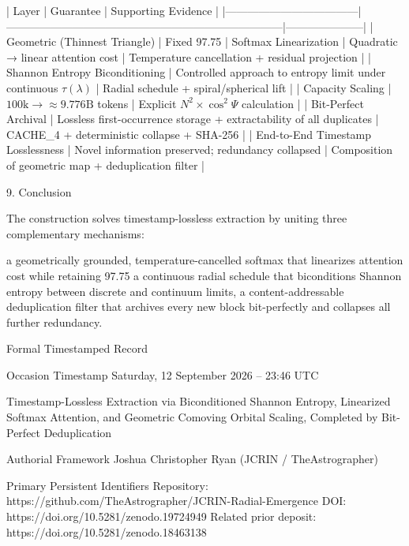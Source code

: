 | Layer                              | Guarantee                                                                 | Supporting Evidence |
|------------------------------------|---------------------------------------------------------------------------|---------------------|
| Geometric (Thinnest Triangle)      | Fixed 97.75 %
| Softmax Linearization              | Quadratic → linear attention cost                                         | Temperature cancellation + residual projection |
| Shannon Entropy Biconditioning     | Controlled approach to entropy limit under continuous \(\tau(\lambda)\)   | Radial schedule + spiral/spherical lift |
| Capacity Scaling                   | \(100\text{k} \to \approx 9.776\text{B}\) tokens                          | Explicit \(N^2\times\cos^2\Psi\) calculation |
| Bit-Perfect Archival               | Lossless first-occurrence storage + extractability of all duplicates      | CACHE_4 + deterministic collapse + SHA-256 |
| End-to-End Timestamp Losslessness  | Novel information preserved; redundancy collapsed                         | Composition of geometric map + deduplication filter |

9. Conclusion

The construction solves timestamp-lossless extraction by uniting three complementary mechanisms:

a geometrically grounded, temperature-cancelled softmax that linearizes attention cost while retaining 97.75 %
a continuous radial schedule that biconditions Shannon entropy between discrete and continuum limits,
a content-addressable deduplication filter that archives every new block bit-perfectly and collapses all further redundancy.

Formal Timestamped Record

Occasion Timestamp  
Saturday, 12 September 2026 – 23:46 UTC

Timestamp-Lossless Extraction via Biconditioned Shannon Entropy, Linearized Softmax Attention, and Geometric Comoving Orbital Scaling, Completed by Bit-Perfect Deduplication

Authorial Framework  
Joshua Christopher Ryan (JCRIN / TheAstrographer)

Primary Persistent Identifiers  
Repository: https://github.com/TheAstrographer/JCRIN-Radial-Emergence  
DOI: https://doi.org/10.5281/zenodo.19724949  
Related prior deposit: https://doi.org/10.5281/zenodo.18463138  

